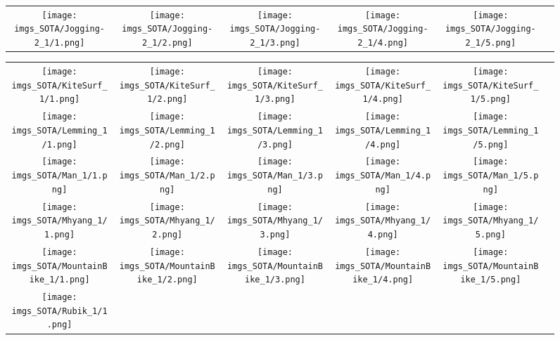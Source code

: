 \begin{figure}[H]
\begin{tabular}{@{}c@{}c@{}c@{}c@{}c@{}c@{}}
\texttt{[image: imgs\_SOTA/Jogging-2\_1/1.png]}&
\texttt{[image: imgs\_SOTA/Jogging-2\_1/2.png]}&
\texttt{[image: imgs\_SOTA/Jogging-2\_1/3.png]}&
\texttt{[image: imgs\_SOTA/Jogging-2\_1/4.png]}&
\texttt{[image: imgs\_SOTA/Jogging-2\_1/5.png]}&
\\
\end{tabular}\end{figure}\begin{figure}[H]
\setlength{\tabcolsep}{6pt}
\renewcommand{\arraystretch}{0}
\begin{tabular}{@{}c@{}c@{}c@{}c@{}c@{}c@{}}\texttt{[image: imgs\_SOTA/KiteSurf\_1/1.png]}&
\texttt{[image: imgs\_SOTA/KiteSurf\_1/2.png]}&
\texttt{[image: imgs\_SOTA/KiteSurf\_1/3.png]}&
\texttt{[image: imgs\_SOTA/KiteSurf\_1/4.png]}&
\texttt{[image: imgs\_SOTA/KiteSurf\_1/5.png]}&
\\
\texttt{[image: imgs\_SOTA/Lemming\_1/1.png]}&
\texttt{[image: imgs\_SOTA/Lemming\_1/2.png]}&
\texttt{[image: imgs\_SOTA/Lemming\_1/3.png]}&
\texttt{[image: imgs\_SOTA/Lemming\_1/4.png]}&
\texttt{[image: imgs\_SOTA/Lemming\_1/5.png]}&
\\
\texttt{[image: imgs\_SOTA/Man\_1/1.png]}&
\texttt{[image: imgs\_SOTA/Man\_1/2.png]}&
\texttt{[image: imgs\_SOTA/Man\_1/3.png]}&
\texttt{[image: imgs\_SOTA/Man\_1/4.png]}&
\texttt{[image: imgs\_SOTA/Man\_1/5.png]}&
\\
\texttt{[image: imgs\_SOTA/Mhyang\_1/1.png]}&
\texttt{[image: imgs\_SOTA/Mhyang\_1/2.png]}&
\texttt{[image: imgs\_SOTA/Mhyang\_1/3.png]}&
\texttt{[image: imgs\_SOTA/Mhyang\_1/4.png]}&
\texttt{[image: imgs\_SOTA/Mhyang\_1/5.png]}&
\\
\texttt{[image: imgs\_SOTA/MountainBike\_1/1.png]}&
\texttt{[image: imgs\_SOTA/MountainBike\_1/2.png]}&
\texttt{[image: imgs\_SOTA/MountainBike\_1/3.png]}&
\texttt{[image: imgs\_SOTA/MountainBike\_1/4.png]}&
\texttt{[image: imgs\_SOTA/MountainBike\_1/5.png]}&
\\
\texttt{[image: imgs\_SOTA/Rubik\_1/1.png]}&

\end{tabular}
\end{figure}
